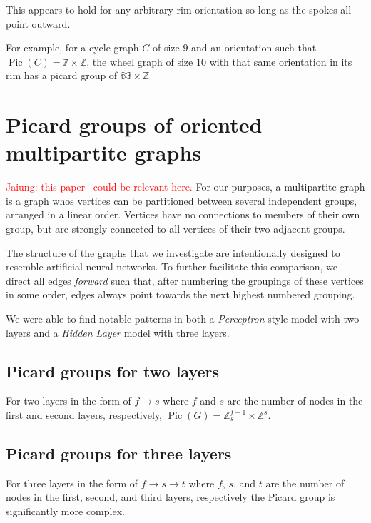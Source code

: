 \documentclass[11pt,reqno]{amsart}
\DeclareMathOperator{\Pic}{Pic}
\theoremstyle{definition}
\theoremstyle{plain}
\begin{document}
This appears to hold for any arbitrary rim orientation so long as the spokes all point outward.

For example, for a cycle graph $C$ of size $9$ and an orientation such that $\Pic(C) = \mathbb{7} \times \mathbb{Z}$,
the wheel graph of size $10$ with that same orientation in its rim has a picard group of $\mathbb{63} \times \mathbb{Z}$



\section{Picard groups of oriented multipartite graphs}
\textcolor{red}{Jaiung: this paper~\cite{jacobson2003critical} could be relevant here.}
	For our purposes, a multipartite graph is a graph whos vertices can be partitioned between several independent
	groups, arranged in a linear order.  Vertices have no connections to members of their own group, but are strongly
	connected to all vertices of their two adjacent groups.

	The structure of the graphs that we investigate are intentionally designed to resemble artificial neural networks.
	To further facilitate this comparison, we direct all edges \textit{forward} such that, after numbering the groupings
	of these vertices in some order, edges always point towards the next highest numbered grouping.

	We were able to find notable patterns in both a \textit{Perceptron} style model with two layers and a
	\textit{Hidden Layer} model with three layers.

	\subsection{Picard groups for two layers}
		For two layers in the form of $f \rightarrow s$ where $f$ and $s$ are the number of nodes in the first and
		second layers, respectively, $\Pic(G) = \mathbb{Z}_{s}^{f-1} \times \mathbb{Z}^s$.

	\subsection{Picard groups for three layers}
		For three layers in the form of $f \rightarrow s \rightarrow t$ where $f$, $s$, and $t$ are the number of nodes
		in the first, second, and third layers, respectively the Picard group is significantly more complex.
\end{document}
